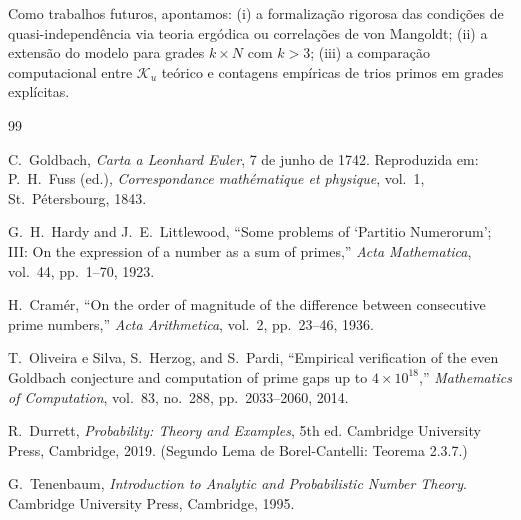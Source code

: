 \documentclass{article}
\begin{document}
	Como trabalhos futuros, apontamos: (i) a formalização rigorosa das
	condições de quasi-independência via teoria ergódica ou correlações
	de von Mangoldt; (ii) a extensão do modelo para grades $k \times N$
	com $k > 3$; (iii) a comparação computacional entre $\mathcal{K}_u$
	teórico e contagens empíricas de trios primos em grades explícitas.
	
	\begin{thebibliography}{99}
		
		C.~Goldbach, \emph{Carta a Leonhard Euler}, 7 de junho de 1742.
		Reproduzida em: P.~H.~Fuss (ed.), \textit{Correspondance
			mathématique et physique}, vol.~1, St.\ Pétersbourg, 1843.
		
		G.~H.~Hardy and J.~E.~Littlewood,
		``Some problems of `Partitio Numerorum'; III: On the expression
		of a number as a sum of primes,''
		\textit{Acta Mathematica}, vol.~44, pp.~1--70, 1923.
		
		H.~Cramér,
		``On the order of magnitude of the difference between consecutive
		prime numbers,''
		\textit{Acta Arithmetica}, vol.~2, pp.~23--46, 1936.
		
		T.~Oliveira e Silva, S.~Herzog, and S.~Pardi,
		``Empirical verification of the even Goldbach conjecture and
		computation of prime gaps up to $4 \times 10^{18}$,''
		\textit{Mathematics of Computation}, vol.~83, no.~288,
		pp.~2033--2060, 2014.
		
		R.~Durrett,
		\textit{Probability: Theory and Examples}, 5th ed.
		Cambridge University Press, Cambridge, 2019.
		(Segundo Lema de Borel-Cantelli: Teorema 2.3.7.)
		
		G.~Tenenbaum,
		\textit{Introduction to Analytic and Probabilistic Number Theory}.
		Cambridge University Press, Cambridge, 1995.
		
	\end{thebibliography}
	
\end{document}
